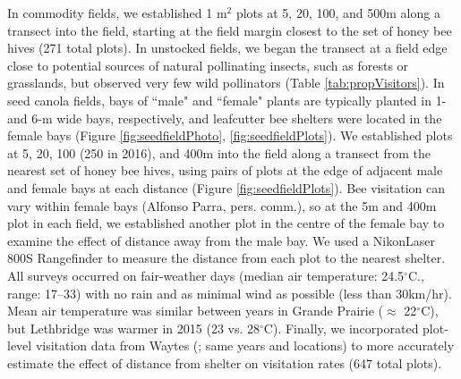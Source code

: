 \documentclass[12pt]{article} %
\begin{document}
In commodity fields, we established 1 m$^2$ plots at 5, 20, 100, and 500m along a transect into the field, starting at the field margin closest to the set of honey bee hives (271 total plots). %
In unstocked fields, we began the transect at a field edge close to potential sources of natural pollinating insects, such as forests or grasslands, but observed very few wild pollinators (Table \ref{tab:propVisitors}).
In seed canola fields, bays of ``male" and ``female" plants are typically planted in 1- and 6-m wide bays, respectively, and leafcutter bee shelters were located in the female bays (Figure \ref{fig:seedfieldPhoto}, \ref{fig:seedfieldPlots}).
We established plots at 5, 20, 100 (250 in 2016), and 400m into the field along a transect from the nearest set of honey bee hives, using pairs of plots at the edge of adjacent male and female bays at each distance (Figure \ref{fig:seedfieldPlots}).
Bee visitation can vary within female bays (Alfonso Parra, pers. comm.), so at the 5m and 400m plot in each field, we established another plot in the centre of the female bay to examine the effect of distance away from the male bay.
We used a Nikon\texttrademark Laser 800S Rangefinder to measure the distance from each plot to the nearest shelter.
All surveys occurred on fair-weather days (median air temperature: 24.5$^\circ$C., range: 17--33) with no rain and as minimal wind as possible (less than 30km/hr).
Mean air temperature was similar between years in Grande Prairie ($\approx$ 22$^\circ$C), but Lethbridge was warmer in 2015 (23 vs. 28$^\circ$C).
Finally, we incorporated plot-level visitation data from Waytes (\citeyear{waytesMsc}; same years and locations) to more accurately estimate the effect of distance from shelter on visitation rates (647 total plots).
\end{document}
